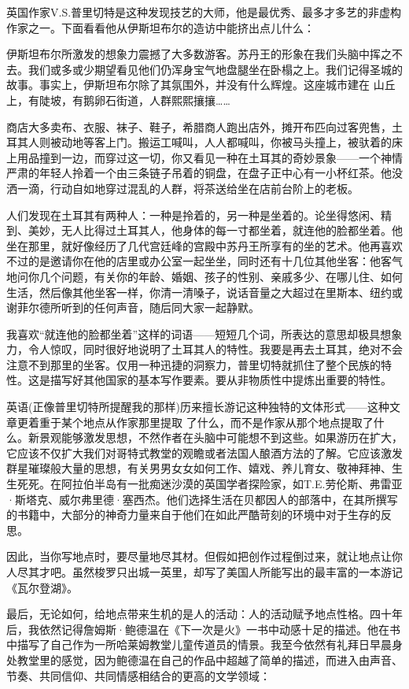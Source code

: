 英国作家V.S.普里切特是这种发现技艺的大师，他是最优秀、最多才多艺的非虚构作家之一。下面看看他从伊斯坦布尔的造访中能挤出点儿什么：

伊斯坦布尔所激发的想象力震撼了大多数游客。苏丹王的形象在我们头脑中挥之不去。我们或多或少期望看见他们仍浑身宝气地盘腿坐在卧榻之上。我们记得圣城的故事。事实上，伊斯坦布尔除了其氛围外，并没有什么辉煌。这座城市建在 山丘上，有陡坡，有鹅卵石街道，人群熙熙攘攘……

商店大多卖布、衣服、袜子、鞋子，希腊商人跑出店外，摊开布匹向过客兜售，土耳其人则被动地等客上门。搬运工喊叫，人人都喊叫，你被马头撞上，被驮着的床上用品撞到一边，而穿过这一切，你又看见一种在土耳其的奇妙景象——一个神情严肃的年轻人拎着一个由三条链子吊着的铜盘，在盘子正中心有一小杯红茶。他没洒一滴，行动自如地穿过混乱的人群，将茶送给坐在店前台阶上的老板。

人们发现在土耳其有两种人：一种是拎着的，另一种是坐着的。论坐得悠闲、精到、美妙，无人比得过土耳其人，他身体的每一寸都坐着，就连他的脸都坐着。他坐在那里，就好像经历了几代宫廷峰的宫殿中苏丹王所享有的坐的艺术。他再喜欢不过的是邀请你在他的店里或办公室一起坐坐，同时还有十几位其他坐客：他客气地问你几个问题，有关你的年龄、婚姻、孩子的性别、亲戚多少、在哪儿住、如何生活，然后像其他坐客一样，你清一清嗓子，说话音量之大超过在里斯本、纽约或谢菲尔德所听到的任何声音，随后同大家一起静默。

我喜欢“就连他的脸都坐着”这样的词语——短短几个词，所表达的意思却极具想象力，令人惊叹，同时很好地说明了土耳其人的特性。我要是再去土耳其，绝对不会注意不到那里的坐客。仅用一种迅捷的洞察力，普里切特就抓住了整个民族的特性。这是描写好其他国家的基本写作要素。要从非物质性中提炼出重要的特性。

英语(正像普里切特所提醒我的那样)历来擅长游记这种独特的文体形式——这种文章更着重于某个地点从作家那里提取 了什么，而不是作家从那个地点提取了什么。新景观能够激发思想，不然作者在头脑中可能想不到这些。如果游历在扩大，它应该不仅扩大我们对哥特式教堂的观瞻或者法国人酿酒方法的了解。它应该激发群星璀璨般大量的思想，有关男男女女如何工作、嬉戏、养儿育女、敬神拜神、生生死死。在阿拉伯半岛有一批痴迷沙漠的英国学者探险家，如T.E.劳伦斯、弗雷亚·斯塔克、威尔弗里德·塞西杰。他们选择生活在贝都因人的部落中，在其所撰写的书籍中，大部分的神奇力量来自于他们在如此严酷苛刻的环境中对于生存的反思。

因此，当你写地点时，要尽量地尽其材。但假如把创作过程倒过来，就让地点让你人尽其才吧。虽然梭罗只出城一英里，却写了美国人所能写出的最丰富的一本游记《瓦尔登湖》。

最后，无论如何，给地点带来生机的是人的活动：人的活动赋予地点性格。四十年后，我依然记得詹姆斯·鲍德温在《下一次是火》一书中动感十足的描述。他在书中描写了自己作为一所哈莱姆教堂儿童传道员的情景。我至今依然有礼拜日早晨身处教堂里的感觉，因为鲍德温在自己的作品中超越了简单的描述，而进入由声音、节奏、共同信仰、共同情感相结合的更高的文学领域：

